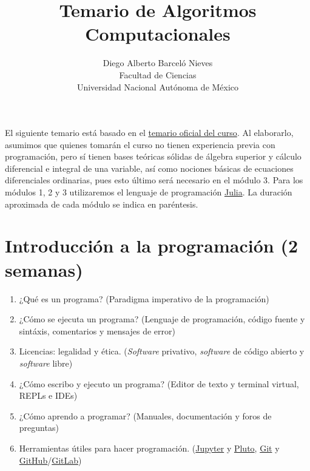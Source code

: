 \documentclass[a4paper]{article}
\begin{document}
\title{Temario de Algoritmos Computacionales}
\author{Diego Alberto Barceló Nieves \\ Facultad de Ciencias \\ Universidad Nacional Autónoma de México}
\date{}
\maketitle

El siguiente temario está basado en el \href{https://www.fciencias.unam.mx/estudiar-en-ciencias/estudios/licenciaturas/asignaturas/2016/1430}{temario oficial del curso}. Al elaborarlo, asumimos que quienes tomarán el curso no tienen experiencia previa con programación, pero sí tienen bases teóricas sólidas de álgebra superior y cálculo diferencial e integral de una variable, así como nociones básicas de ecuaciones diferenciales ordinarias, pues esto último será necesario en el módulo 3. Para los módulos 1, 2 y 3 utilizaremos el lenguaje de programación \href{https://julialang.org/}{Julia}. La duración aproximada de cada módulo se indica en paréntesis.

\setcounter{section}{-1}

\section{Introducción a la programación (2 semanas)} \label{Sec: Introducción a la programación (2 semanas)} 

\begin{enumerate}[label=\arabic*.]

    \item ¿Qué es un programa? (Paradigma imperativo de la programación)

    \item ¿Cómo se ejecuta un programa? (Lenguaje de programación, código fuente y sintáxis, comentarios y mensajes de error)
    \item Licencias: legalidad y ética. (\emph{Software} privativo, \emph{software} de código abierto y \emph{software} libre)
    \item ¿Cómo escribo y ejecuto un programa? (Editor de texto y terminal virtual, REPLs e IDEs)
    \item ¿Cómo aprendo a programar? (Manuales, documentación y foros de preguntas)
    \item Herramientas útiles para hacer programación. (\href{https://jupyter.org/}{Jupyter} y \href{https://github.com/fonsp/Pluto.jl/blob/main/README.md}{Pluto}, \href{https://git-scm.com/}{Git} y \href{https://github.com/}{GitHub}/\href{https://about.gitlab.com/}{GitLab})
\end{enumerate}
\end{document}
